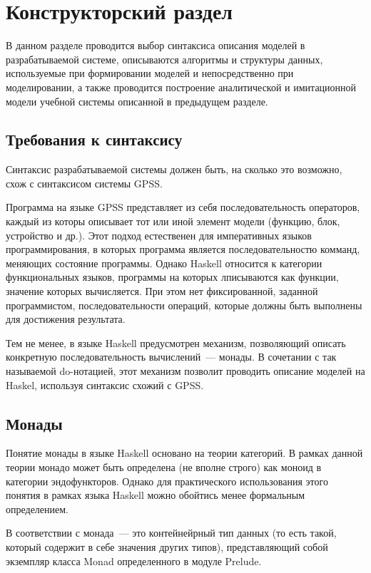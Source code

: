 \chapter{Конструкторский раздел}

В данном разделе проводится выбор синтаксиса описания моделей в разрабатываемой системе, описываются алгоритмы и структуры данных, используемые при формировании моделей и непосредственно при моделировании, а также проводится построение аналитической и имитационной модели учебной системы описанной в предыдущем разделе.



\section{Требования к синтаксису}

Синтаксис разрабатываемой системы должен быть, на сколько это возможно, схож с синтаксисом системы GPSS. 

Программа на языке GPSS представляет из себя последовательность операторов, каждый из которы описывает тот или иной элемент модели (функцию, блок, устройство и др.). Этот подход естественен для императивных языков программирования, в которых программа является последовательностю комманд, меняющих состояние программы. Однако Haskell относится к категории функциональных языков, программы на которых лписываются как функции, значение которых вычисляется. При этом нет фиксированной, заданной программистом, последовательности операций, которые должны быть выполнены для достижения результата. 

Тем не менее, в языке Haskell предусмотрен механизм, позволяющий описать конкретную последовательность вычислений~--- монады. В сочетании с так называемой do-нотацией, этот механизм позволит проводить описание моделей на Haskel, используя синтаксис схожий с GPSS.

\section{Монады}

Понятие монады в языке Haskell основано на теории категорий. В рамках данной теории монадо может быть определена (не вполне строго) как моноид в категории эндофункторов. Однако для практического использования этого понятия в рамках языка Haskell можно обойтись менее формальным определением.

В соответствии с \cite{Haskell} монада~--- это контейнейрный тип данных (то есть такой, который содержит в себе значения других типов), представляющий собой экземпляр класса Monad определенного в модуле Prelude. 

